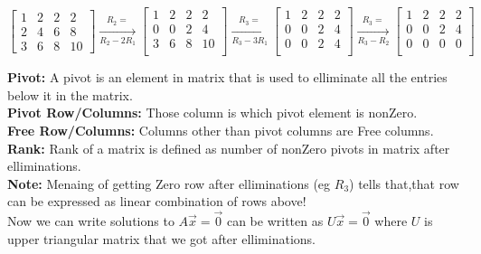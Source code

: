 \documentclass[a4paper,11pt]{article}
\numberwithin{equation}{section}
\begin{document}
\begin{itemize}
\begin{center}
    \[
        \begin{bmatrix}
            1&2&2&2\\
            2&4&6&8\\
            3&6&8&10
        \end{bmatrix} \xrightarrow[R_2-2R_1]{R_2=}
        \begin{bmatrix}
            1&2&2&2\\
            0&0&2&4\\
            3&6&8&10\\
        \end{bmatrix} \xrightarrow[R_3-3R_1]{R_3=}
        \begin{bmatrix}
            1&2&2&2\\
            0&0&2&4\\
            0&0&2&4\\
        \end{bmatrix} \xrightarrow[R_3-R_2]{R_3=}
        \begin{bmatrix}
            1&2&2&2\\
            0&0&2&4\\
            0&0&0&0\\
        \end{bmatrix}
    \]
\end{center}


\textbf{Pivot: }A pivot is an element in matrix that is used to elliminate all the entries below it in the matrix.\\
\textbf{Pivot Row/Columns: }Those column is which pivot element is nonZero.\\
\textbf{Free Row/Columns: }Columns other than pivot columns are Free columns.\\
\textbf{Rank: }Rank of a matrix is defined as number of nonZero pivots in matrix after elliminations.\\

\textbf{Note: }Menaing of getting Zero row after elliminations (eg $R_3$) tells that,that row can be expressed as linear combination of rows above!\\

Now we can write solutions to $A\vec{x}=\vec{0}$ can be written as $U\vec{x}=\vec{0}$ where $U$ is upper triangular matrix that we got after elliminations.


\end{itemize}
\end{document}

